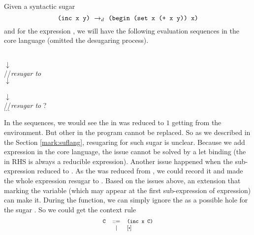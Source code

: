 Given a syntactic sugar 
\[\texttt{(inc x y)} ~\rightarrow_d~ \texttt{(begin (set x (+ x y)) x)}\]
and for the expression , we will have the following evaluation sequences in the core language (omitted the desugaring process).
\begin{center}{\footnotesize
	\\
	$\downarrow$\\
	 \qquad//{\scriptsize\emph{resugar to }}\\
	$\downarrow$\\
	 \\
	$\downarrow$\\
	 \qquad//{\scriptsize\emph{resugar to }?}\\
	$\ldots$
}
\end{center}
In the sequences, we would see the  in  was reduced to $1$ getting from the environment. But other  in the program cannot be replaced. So as we described in the Section \ref{mark:suflang}, resugaring for such sugar is unclear. Because we add  expression in the core language, the issue cannot be solved by a let binding (the  in RHS is always a reducible expression). 
Another issue happened when the sub-expression  reduced to . As the  was reduced from , we could record it and made the whole expression resugar to . Based on the issues above, an extension that marking the variable (which may appear at the first sub-expression of  expression) can make it. During the  function, we can simply ignore the  as a possible hole for the sugar . So we could get the context rule 
\[
	{\footnotesize
	\begin{array}{lcl}
		\Code{C}&::=&\Code{(inc x C)}\\
		& | &[\bigcdot]
	\end{array}
	}
\]

